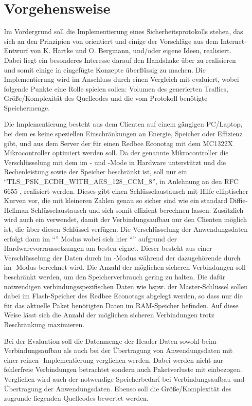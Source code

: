 \chapter{Vorgehensweise}

Im Vordergrund soll die Implementierung eines Sicherheitsprotokolls stehen, das sich an den Prinzipien von  orientiert
und einige der Vorschläge aus dem Internet-Entwurf von K. Hartke und O. Bergmann, und/oder eigene Ideen, realisiert.
Dabei liegt ein besonderes Interesse darauf den Handshake über  \cite{draftcoap} zu realisieren und somit einige in  eingefügte
Konzepte überflüssig zu machen. Die Implementierung wird im Anschluss durch einen Vergleich mit  evaluiert, wobei folgende Punkte eine
Rolle spielen sollen: Volumen des generierten Traffics, Größe/Komplexität des Quellcodes und die vom Protokoll benötigte Speichermenge.

Die Implementierung besteht aus dem Clienten auf einem gängigen PC/Laptop, bei dem es keine speziellen Einschränkungen an Energie,
Speicher oder Effizienz gibt, und aus dem Server der für einen Redbee Econotag \cite{econotag} mit dem MC1322X
Mikrocontroller \cite{mc1322x} optimiert werden soll. Da der genannte Mikrocontroller die Verschlüsselung mit dem  im - und -Mode
in Hardware unterstützt und die Rechenleistung sowie der Speicher beschränkt ist, soll nur ein  "`TLS\_PSK\_ECDH\_WITH\_AES\_128\_CCM\_8"',
in Anlehnung an den RFC 6655 \cite{rfc6655}, realisiert werden. Dieses gibt einen Schlüsselaustausch mit
Hilfe elliptischer Kurven vor, die mit kleineren Zahlen genau so sicher sind wie ein standard Diffie-Hellman-Schlüsselaustausch und sich somit
effizient berechnen lassen. Zusätzlich wird auch ein  verwendet, damit der Verbindungsaufbau nur den Clienten möglich ist, die über diesen
Schlüssel verfügen. Die Verschlüsselung der Anwendungsdaten erfolgt dann im "`"' Modus \cite{rfc5116}
wobei sich hier "`"' \cite{rfc3610} aufgrund der Hardwarevorraussetzungen am besten eignet. Dieser besteht
aus einer Verschlüsselung der Daten durch  im -Modus während der dazugehörende  durch  im -Modus berechnet wird.
Die Anzahl der möglichen sicheren Verbindungen soll beschränkt werden, um den Speicherverbrauch gering zu halten.
Die dafür notwendigen verbindungsspezifischen Daten wie bspw. der Master-Schlüssel sollen dabei im Flash-Speicher des Redbee Econotags
abgelegt werden, so dass nur die für das aktuelle Paket benötigten Daten im RAM-Speicher befinden. Auf diese Weise lässt sich
die Anzahl der möglichen sicheren Verbindungen trotz Beschränkung maximieren.

Bei der Evaluation soll die Datenmenge der Header-Daten sowohl beim Verbindungsaufbau als auch bei der Übertragung von Anwendungsdaten
mit einer reinen -Implementierung verglichen werden. Dabei werden nicht nur fehlerfreie Verbindungen betrachtet sondern auch Paketverluste
mit einbezogen. Verglichen wird auch der notwendige Speicherbedarf bei Verbindungsaufbau und Übertragung der Anwendungsdaten.
Ebenso soll die Größe/Komplexität des zugrunde liegenden Quellcodes bewertet werden.